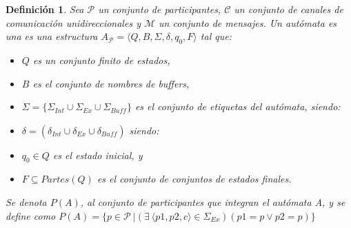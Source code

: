 \documentclass[paper=a4, fontsize=11pt, spanish]{scrartcl} %
\numberwithin{equation}{section} %
\numberwithin{figure}{section} %
\numberwithin{table}{section} %
\newtheorem{definition}{Definición}
\begin{document}
\begin{definition} Sea $\mathcal{P}$ un conjunto de participantes, $\mathcal{C}$ un conjunto de canales de comunicación unidireccionales y $\mathcal{M}$ un conjunto de mensajes. Un autómata es una es una estructura $A_\mathcal{P} = \langle Q, B, \Sigma, \delta, q_0, F\rangle$ tal que:

\begin{itemize}
\item $Q$ es un conjunto finito de estados,
\item $B$ es el conjunto de nombres de buffers,
\item $\Sigma = \{ \Sigma_\mathit{Int} \cup \Sigma_\mathit{Ex} \cup \Sigma_\mathit{Buff}\} $ es el conjunto de etiquetas del autómata, siendo:
\item $\delta = (\delta_\mathit{Int} \cup \delta_\mathit{Ex} \cup \delta_\mathit{Buff})$ siendo:

\item $q_0 \in Q$ es el estado inicial, y
\item $F \subseteq \mathit{Partes(Q)}$ es el conjunto de conjuntos de estados finales. 
\end{itemize}

Se denota $P(A)$, al conjunto de participantes que integran el autómata A, y se define como $P(A) = \{ p \in \mathcal{P} \ | (\exists\ \langle p1,p2,c\rangle \in \Sigma_\mathit{Ex})(p1=p \lor p2=p) \} $ 
\end{definition}
\end{document}
